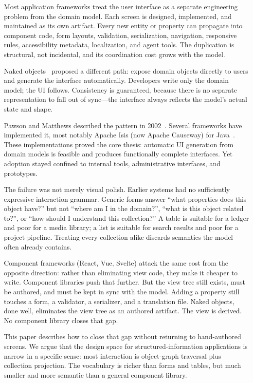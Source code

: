 \documentclass[sigplan,review,anonymous,10pt]{acmart}
\begin{document}
Most application frameworks treat the user interface as a separate engineering problem from the domain model. Each screen is designed, implemented, and maintained as its own artifact. Every new entity or property can propagate into component code, form layouts, validation, serialization, navigation, responsive rules, accessibility metadata, localization, and agent tools. The duplication is structural, not incidental, and its coordination cost grows with the model.

Naked objects~\cite{pawsonbook} proposed a different path: expose domain objects directly to users and generate the interface automatically. Developers write only the domain model; the UI follows. Consistency is guaranteed, because there is no separate representation to fall out of sync---the interface always reflects the model's actual state and shape.

Pawson and Matthews described the pattern in 2002~\cite{pawsonbook,pawson2004}. Several frameworks have implemented it, most notably Apache Isis (now Apache Causeway) for Java~\cite{causeway}. These implementations proved the core thesis: automatic UI generation from domain models is feasible and produces functionally complete interfaces. Yet adoption stayed confined to internal tools, administrative interfaces, and prototypes.

The failure was not merely visual polish. Earlier systems had no sufficiently expressive interaction grammar. Generic forms answer ``what properties does this object have?'' but not ``where am I in the domain?'', ``what is this object related to?'', or ``how should I understand this collection?'' A table is suitable for a ledger and poor for a media library; a list is suitable for search results and poor for a project pipeline. Treating every collection alike discards semantics the model often already contains.

Component frameworks (React, Vue, Svelte) attack the same cost from the opposite direction: rather than eliminating view code, they make it cheaper to write. Component libraries push that further. But the view tree still exists, must be authored, and must be kept in sync with the model. Adding a property still touches a form, a validator, a serializer, and a translation file. Naked objects, done well, eliminates the view tree as an authored artifact. The view is derived. No component library closes that gap.

This paper describes how to close that gap without returning to hand-authored screens. We argue that the design space for structured-information applications is narrow in a specific sense: most interaction is object-graph traversal plus collection projection. The vocabulary is richer than forms and tables, but much smaller and more semantic than a general component library.
\end{document}
